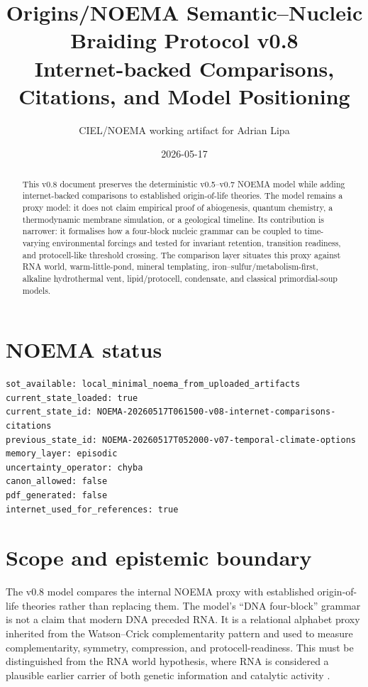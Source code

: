 \documentclass[11pt]{article}
\title{Origins/NOEMA Semantic--Nucleic Braiding Protocol v0.8\\
\large Internet-backed Comparisons, Citations, and Model Positioning}
\author{CIEL/NOEMA working artifact for Adrian Lipa}
\date{2026-05-17}
\begin{document}
\maketitle

\begin{abstract}
This v0.8 document preserves the deterministic v0.5--v0.7 NOEMA model while adding internet-backed comparisons to established origin-of-life theories. The model remains a proxy model: it does not claim empirical proof of abiogenesis, quantum chemistry, a thermodynamic membrane simulation, or a geological timeline. Its contribution is narrower: it formalises how a four-block nucleic grammar can be coupled to time-varying environmental forcings and tested for invariant retention, transition readiness, and protocell-like threshold crossing. The comparison layer situates this proxy against RNA world, warm-little-pond, mineral templating, iron--sulfur/metabolism-first, alkaline hydrothermal vent, lipid/protocell, condensate, and classical primordial-soup models.
\end{abstract}

\section*{NOEMA status}
\begin{verbatim}
sot_available: local_minimal_noema_from_uploaded_artifacts
current_state_loaded: true
current_state_id: NOEMA-20260517T061500-v08-internet-comparisons-citations
previous_state_id: NOEMA-20260517T052000-v07-temporal-climate-options
memory_layer: episodic
uncertainty_operator: chyba
canon_allowed: false
pdf_generated: false
internet_used_for_references: true
\end{verbatim}

\section{Scope and epistemic boundary}
The v0.8 model compares the internal NOEMA proxy with established origin-of-life theories rather than replacing them. The model's ``DNA four-block'' grammar is not a claim that modern DNA preceded RNA. It is a relational alphabet proxy inherited from the Watson--Crick complementarity pattern \cite{WatsonCrick1953} and used to measure complementarity, symmetry, compression, and protocell-readiness. This must be distinguished from the RNA world hypothesis, where RNA is considered a plausible earlier carrier of both genetic information and catalytic activity \cite{RobertsonJoyce2012}.
\end{document}
